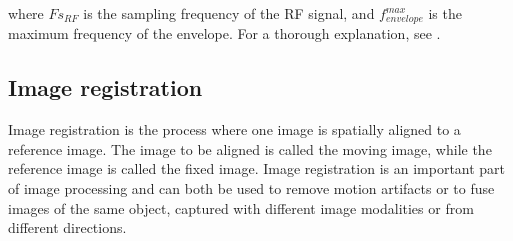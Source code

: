 where $Fs_{RF}$ is the sampling frequency of the RF signal, and $f^{max}_{envelope}$ is the maximum frequency of the envelope. For a thorough explanation, see \cite{Crochiere1981}.




%
%


\subsection{Image registration}
Image registration is the process where one image is spatially aligned to a reference image. The image to be aligned is called the moving image, while the reference image is called the fixed image. Image registration  is an important part of image processing and can both be used to remove motion artifacts or to fuse images of the same object, captured with different image modalities or from different directions. 


